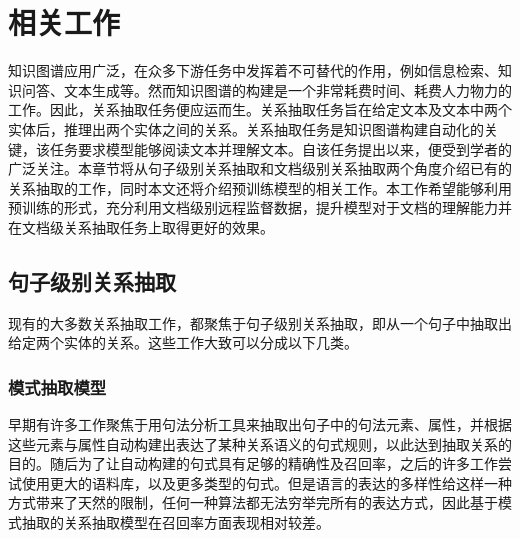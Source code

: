 
\chapter{相关工作}
\label{cha:related_work}

知识图谱应用广泛，在众多下游任务中发挥着不可替代的作用，例如信息检索、知识问答、文本生成等。然而知识图谱的构建是一个非常耗费时间、耗费人力物力的工作。因此，关系抽取任务便应运而生。关系抽取任务旨在给定文本及文本中两个实体后，推理出两个实体之间的关系。关系抽取任务是知识图谱构建自动化的关键，该任务要求模型能够阅读文本并理解文本。自该任务提出以来，便受到学者的广泛关注。本章节将从句子级别关系抽取和文档级别关系抽取两个角度介绍已有的关系抽取的工作，同时本文还将介绍预训练模型的相关工作。本工作希望能够利用预训练的形式，充分利用文档级别远程监督数据，提升模型对于文档的理解能力并在文档级关系抽取任务上取得更好的效果。

\section{句子级别关系抽取}

现有的大多数关系抽取工作，都聚焦于句子级别关系抽取，即从一个句子中抽取出给定两个实体的关系。这些工作大致可以分成以下几类。

\subsection{模式抽取模型} 
早期有许多工作聚焦于用句法分析工具来抽取出句子中的句法元素、属性，并根据这些元素与属性自动构建出表达了某种关系语义的句式规则，以此达到抽取关系的目的\cite{soderland1995crystal,kim1995acquisition,mooney1999relational}。随后为了让自动构建的句式具有足够的精确性及召回率，之后的许多工作尝试使用更大的语料库\cite{carlson2010toward}，以及更多类型的句式\cite{nakashole2012patty,jiang2017metapad}。但是语言的表达的多样性给这样一种方式带来了天然的限制，任何一种算法都无法穷举完所有的表达方式，因此基于模式抽取的关系抽取模型在召回率方面表现相对较差。

